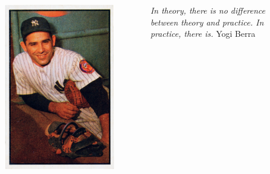 \begin{frame}
\begin{columns}
    \begin{column}{.3\textwidth}
\begin{figure}[ht]
    \includegraphics[height=0.4\textheight]{graphics/1953_Bowman_Yogi_Berra}
\end{figure}
\end{column}
\begin{column}{.4\textwidth}
    \emph{In theory, there is no difference between theory and practice. \newline
    In practice, there is.}\newline
    Yogi Berra
\end{column}
\begin{column}{.3\textwidth}
\end{column}
\end{columns}
\end{frame}


